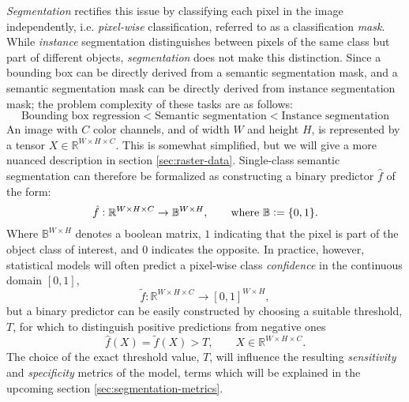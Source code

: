 \textit{Segmentation} rectifies this issue by classifying each pixel in the image independently, i.e. \textit{pixel-wise} classification, referred to as a classification \textit{mask}.
While \textit{instance} segmentation distinguishes between pixels of the same class but part of different objects, \textit{segmentation} does not make this distinction.
Since a bounding box can be directly derived from a semantic segmentation mask, and a semantic segmentation mask can be directly derived from instance segmentation mask; the problem complexity of these tasks are as follows:
%
\begin{equation*}
  \text{Bounding box regression}
  <
  \text{Semantic segmentation}
  <
  \text{Instance segmentation}
\end{equation*}
%
An image with $C$ color channels, and of width $W$ and height $H$, is represented by a tensor $X \in \mathbb{R}^{W \times H \times C}$.
This is somewhat simplified, but we will give a more nuanced description in section \ref{sec:raster-data}.
Single-class semantic segmentation can therefore be formalized as constructing a binary predictor $\hat{f}$ of the form:
%
\begin{equation*}
  \hat{f}: \mathbb{R}^{W \times H \times C} \rightarrow \mathbb{B}^{W \times H}, \hspace{2em} \text{where } \mathbb{B} \vcentcolon= \{0, 1\}.
\end{equation*}
%
Where $\mathbb{B}^{W \times H}$ denotes a boolean matrix, $1$ indicating that the pixel is part of the object class of interest, and $0$ indicates the opposite.
In practice, however, statistical models will often predict a pixel-wise class \textit{confidence} in the continuous domain $[0, 1]$,
%
\begin{equation*}
  \tilde{f}: \mathbb{R}^{W \times H \times C} \rightarrow [0, 1]^{W \times H},
\end{equation*}
%
but a binary predictor can be easily constructed by choosing a suitable threshold, $T$, for which to distinguish positive predictions from negative ones
%
\begin{equation*}
  \hat{f}(X) = \tilde{f}(X) > T, \hspace{2em} X \in \mathbb{R}^{W \times H \times C}.
\end{equation*}
%
The choice of the exact threshold value, $T$, will influence the resulting \textit{sensitivity} and \textit{specificity} metrics of the model, terms which will be explained in the upcoming section \ref{sec:segmentation-metrics}.
